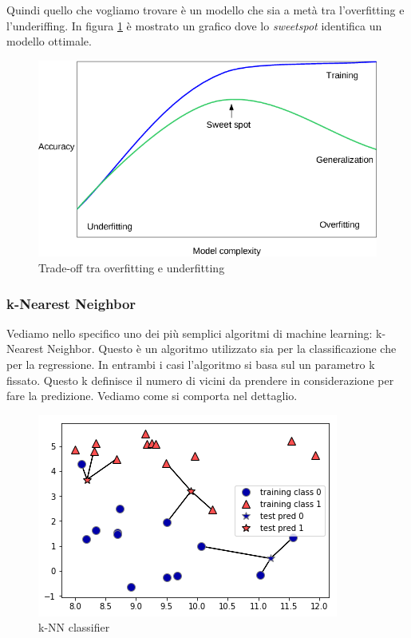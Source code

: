 \documentclass[12pt,italian]{report}
\begin{document}
Quindi quello che vogliamo trovare è un modello che sia a metà tra l'overfitting e l'underiffing.
In figura \ref{fig:tradeoff_img} è mostrato un grafico dove lo \textit{sweetspot} identifica un modello ottimale. 

\begin{figure} [h!]


	\includegraphics[scale=0.5]{../img/tradeoff_overfitting_underfitting.png}
	\caption{Trade-off tra overfitting e underfitting}
	\label{fig:tradeoff_img}
\end{figure}

\pagebreak

\subsubsection{k-Nearest Neighbor}

Vediamo nello specifico uno dei più semplici algoritmi di machine learning: k-Nearest Neighbor. Questo è un algoritmo utilizzato sia per la classificazione che per la regressione. In entrambi i casi l'algoritmo si basa sul un parametro k fissato. Questo k definisce il numero di vicini da prendere in considerazione per fare la predizione. Vediamo come si comporta nel dettaglio.

\vspace{5 mm}
\begin{figure}[h!]
	\center
	\includegraphics[scale=0.7]{../img/knn_classifier}
	\caption{k-NN classifier}
	\label{fig:knn_classifier}
\end{figure}
\end{document}

